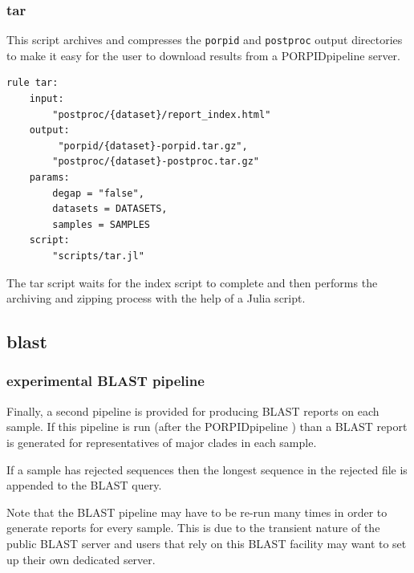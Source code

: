 \documentclass{beamer}
\begin{document}
\begin{frame}[fragile]
\frametitle{tar}

\alert<1> 

This script archives and compresses the {\tt porpid} and {\tt postproc} output directories
to make it easy for the user to download results from a PORPIDpipeline server.

\begin{tiny}
\begin{verbatim}
rule tar:
    input:
        "postproc/{dataset}/report_index.html"
    output:
         "porpid/{dataset}-porpid.tar.gz",
        "postproc/{dataset}-postproc.tar.gz"
    params:
        degap = "false",
        datasets = DATASETS,
        samples = SAMPLES
    script:
        "scripts/tar.jl"
\end{verbatim}
\end{tiny}

The tar script waits for the index script to complete and then performs the
archiving and zipping process with the help of a Julia script.

\end{frame}

\subsection{blast}

\begin{frame}[fragile]
\frametitle{experimental BLAST pipeline}

\alert<1> 

Finally, a second pipeline is provided for producing BLAST reports
on each sample. If this pipeline is run (after the PORPIDpipeline )
than a BLAST report is generated for representatives of major
clades in each sample.  

\bigskip
If a sample has rejected sequences then the longest sequence in 
the rejected file is appended to the BLAST query.

\bigskip
Note that the BLAST pipeline may have to be re-run many times
in order to generate reports for every sample. This is due to the
transient nature of the public BLAST server and users that rely
on this BLAST facility may want to set up their own dedicated 
server.

\end{frame}
\end{document}
